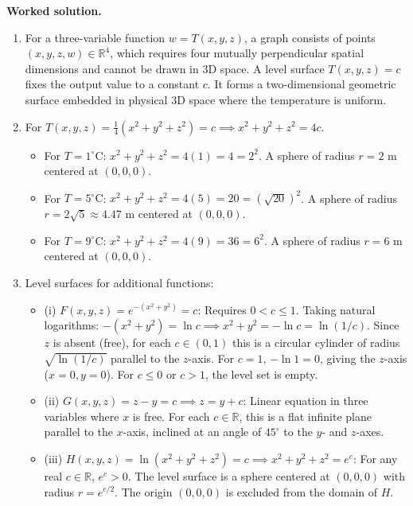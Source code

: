 \documentclass[11pt,letterpaper]{article}
\newcommand{\R}{\mathbb{R}}
\begin{document}
\textbf{Worked solution.}
\begin{enumerate}[label=(\alph*),leftmargin=*]
    \item For a three-variable function $w = T(x,y,z)$, a graph consists of points $(x,y,z,w) \in \R^4$, which requires four mutually perpendicular spatial dimensions and cannot be drawn in 3D space.
    A level surface $T(x,y,z) = c$ fixes the output value to a constant $c$. It forms a two-dimensional geometric surface embedded in physical 3D space where the temperature is uniform.
    \item For $T(x,y,z) = \frac{1}{4}(x^2 + y^2 + z^2) = c \implies x^2 + y^2 + z^2 = 4c$.
    \begin{itemize}[nosep]
        \item For $T = 1^\circ\text{C}$: $x^2 + y^2 + z^2 = 4(1) = 4 = 2^2$. A sphere of radius $r = 2$ m centered at $(0,0,0)$.
        \item For $T = 5^\circ\text{C}$: $x^2 + y^2 + z^2 = 4(5) = 20 = (\sqrt{20})^2$. A sphere of radius $r = 2\sqrt{5} \approx 4.47$ m centered at $(0,0,0)$.
        \item For $T = 9^\circ\text{C}$: $x^2 + y^2 + z^2 = 4(9) = 36 = 6^2$. A sphere of radius $r = 6$ m centered at $(0,0,0)$.
    \end{itemize}
    \item Level surfaces for additional functions:
    \begin{itemize}[nosep]
        \item (i) $F(x,y,z) = e^{-(x^2+y^2)} = c$:
        Requires $0 < c \le 1$. Taking natural logarithms: $-(x^2+y^2) = \ln c \implies x^2 + y^2 = -\ln c = \ln(1/c)$.
        Since $z$ is absent (free), for each $c \in (0,1)$ this is a circular cylinder of radius $\sqrt{\ln(1/c)}$ parallel to the $z$-axis. For $c = 1$, $-\ln 1 = 0$, giving the $z$-axis ($x=0, y=0$). For $c \le 0$ or $c > 1$, the level set is empty.
        \item (ii) $G(x,y,z) = z - y = c \implies z = y + c$:
        Linear equation in three variables where $x$ is free. For each $c \in \R$, this is a flat infinite plane parallel to the $x$-axis, inclined at an angle of $45^\circ$ to the $y$- and $z$-axes.
        \item (iii) $H(x,y,z) = \ln(x^2+y^2+z^2) = c \implies x^2 + y^2 + z^2 = e^c$:
        For any real $c \in \R$, $e^c > 0$. The level surface is a sphere centered at $(0,0,0)$ with radius $r = e^{c/2}$. The origin $(0,0,0)$ is excluded from the domain of $H$.
    \end{itemize}
\end{enumerate}
\end{document}
